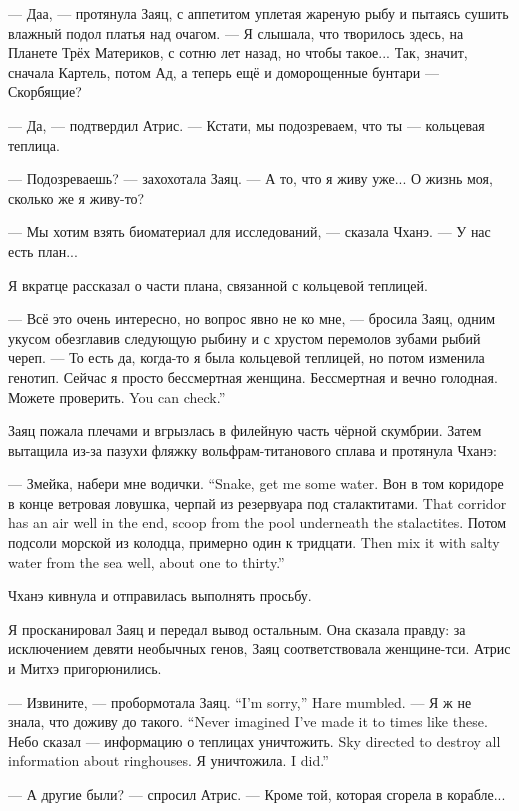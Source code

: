 --- Даа, --- протянула Заяц, с аппетитом уплетая жареную рыбу и пытаясь сушить влажный подол платья над очагом.
--- Я слышала, что творилось здесь, на Планете Трёх Материков, с сотню лет назад, но чтобы такое...
Так, значит, сначала Картель, потом Ад, а теперь ещё и доморощенные бунтари --- Скорбящие?

--- Да, --- подтвердил Атрис.
--- Кстати, мы подозреваем, что ты --- кольцевая теплица.

--- Подозреваешь? --- захохотала Заяц.
--- А то, что я живу уже...
О жизнь моя, сколько же я живу-то?

--- Мы хотим взять биоматериал для исследований, --- сказала Чханэ.
--- У нас есть план...

Я вкратце рассказал о части плана, связанной с кольцевой теплицей.

--- Всё это очень интересно, но вопрос явно не ко мне, --- бросила Заяц, одним укусом обезглавив следующую рыбину и с хрустом перемолов зубами рыбий череп.
--- То есть да, когда-то я была кольцевой теплицей, но потом изменила генотип.
Сейчас я просто бессмертная женщина.
Бессмертная и вечно голодная.
{Можете проверить.}
{You can check.''}

Заяц пожала плечами и вгрызлась в филейную часть чёрной скумбрии.
Затем вытащила из-за пазухи фляжку вольфрам-титанового сплава и протянула Чханэ:

{--- Змейка, набери мне водички.}
{``Snake, get me some water.}
{Вон в том коридоре в конце ветровая ловушка, черпай из резервуара под сталактитами.}
{That corridor has an air well in the end, scoop from the pool underneath the stalactites.}
{Потом подсоли морской из колодца, примерно один к тридцати.}
{Then mix it with salty water from the sea well, about one to thirty.''}

Чханэ кивнула и отправилась выполнять просьбу.

Я просканировал Заяц и передал вывод остальным.
Она сказала правду: за исключением девяти необычных генов, Заяц соответствовала женщине-тси.
Атрис и Митхэ пригорюнились.

{--- Извините, --- пробормотала Заяц.}
{``I'm sorry,'' Hare mumbled.}
{--- Я ж не знала, что доживу до такого.}
{``Never imagined I've made it to times like these.}
{Небо сказал --- информацию о теплицах уничтожить.}
{Sky directed to destroy all information about ringhouses.}
{Я уничтожила.}
{I did.''}

--- А другие были? --- спросил Атрис.
--- Кроме той, которая сгорела в корабле...

